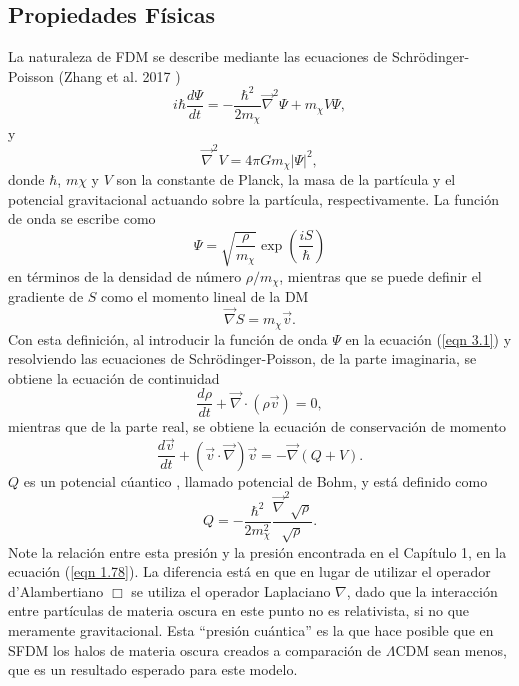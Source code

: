 \documentclass[a4paper,openright,12pt]{book}
\begin{document}
\subsection{Propiedades Físicas}
La naturaleza de FDM se describe mediante las ecuaciones de Schrödinger-Poisson (Zhang et al. 2017 \cite{3.1})
\begin{equation}
i\hbar \frac{d \Psi}{dt} 
=
-\frac{\hbar^{2}}{2m_{\chi}} \vec{\nabla}^{2}\Psi + m_{\chi}V\Psi,\label{eqn 3.1}
\end{equation}
y
\begin{equation}
\vec{\nabla}^{2}V = 4\pi G m_{\chi}|\Psi|^{2},\label{eqn 3.2}
\end{equation}
donde $\hbar$, $m\chi$ y $V$ son la constante de Planck, la masa de la partícula y el potencial gravitacional actuando sobre la partícula, respectivamente. La función de onda se escribe como
\begin{equation}
\Psi = \sqrt{\frac{\rho}{m_{\chi}}}\exp(\frac{iS}{\hbar})\label{eqn 3.3}
\end{equation}
en términos de la densidad de número $\rho/m_{\chi}$, mientras que se puede definir el gradiente de $S$ como el momento lineal de la DM
\begin{equation}
\vec{\nabla}S = m_{\chi}\vec{v}.\label{eqn 3.4}
\end{equation}
Con esta definición, al introducir la función de onda $\Psi$ en la ecuación (\ref{eqn 3.1}) y resolviendo las ecuaciones de Schrödinger-Poisson, de la parte imaginaria, se obtiene la ecuación de continuidad
\begin{equation}
\frac{d\rho}{dt} + \vec{\nabla}\cdot(\rho\vec{v}) = 0,\label{eqn 3.5}
\end{equation}
mientras que de la parte real, se obtiene la ecuación de conservación de momento
\begin{equation}
\frac{d\vec{v}}{dt} + (\vec{v}\cdot\vec{\nabla})\vec{v} 
=
-\vec{\nabla}(Q + V).\label{eqn 3.6}
\end{equation}
$Q$ es un potencial cúantico , llamado potencial de Bohm, y está definido como
\begin{equation}
Q 
=
-\frac{\hbar^{2}}{2m^{2}_{\chi}}\frac{\vec{\nabla}^{2}\sqrt{\rho}}{\sqrt{\rho}}.\label{eqn 3.7}
\end{equation}
Note la relación entre esta presión y la presión encontrada en el Capítulo 1, en la ecuación (\ref{eqn 1.78}). La diferencia está en que en lugar de utilizar el operador d'Alambertiano $\Box$ se utiliza el operador Laplaciano $\nabla$, dado que la interacción entre partículas de materia oscura en este punto no es relativista, si no que meramente gravitacional. Esta ``presión cuántica'' es la que hace posible que en SFDM los halos de materia oscura creados a comparación de $\Lambda$CDM sean menos, que es un resultado esperado para este modelo.
\end{document}
